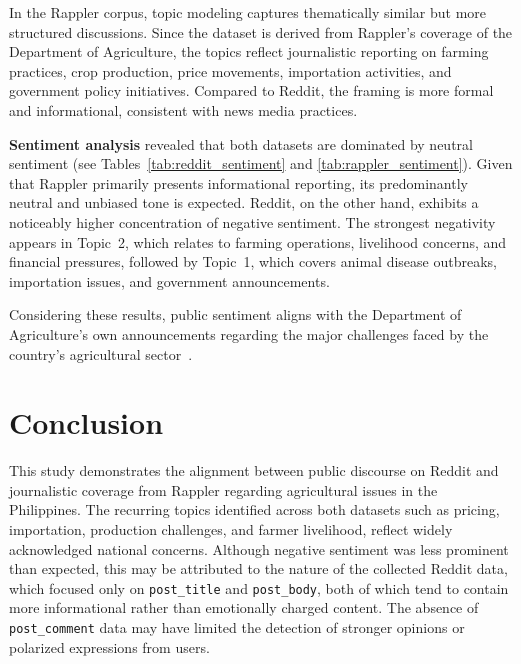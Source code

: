 \documentclass[conference]{IEEEtran}
\begin{document}
In the Rappler corpus, topic modeling captures thematically similar but more structured 
discussions. Since the dataset is derived from Rappler’s coverage of the Department of 
Agriculture, the topics reflect journalistic reporting on farming practices, crop production, 
price movements, importation activities, and government policy initiatives. Compared to 
Reddit, the framing is more formal and informational, consistent with news media practices.

\textbf{Sentiment analysis} revealed that both datasets are dominated by neutral sentiment 
(see Tables~\ref{tab:reddit_sentiment} and \ref{tab:rappler_sentiment}). Given that Rappler 
primarily presents informational reporting, its predominantly neutral and unbiased tone is 
expected. Reddit, on the other hand, exhibits a noticeably higher concentration of negative 
sentiment. The strongest negativity appears in Topic~2, which relates to farming operations, 
livelihood concerns, and financial pressures, followed by Topic~1, which covers animal disease 
outbreaks, importation issues, and government announcements.

Considering these results, public sentiment aligns with the Department of Agriculture’s 
own announcements regarding the major challenges faced by the country’s agricultural 
sector~\cite{a1}.



\section{Conclusion}

This study demonstrates the alignment between public discourse on Reddit and journalistic 
coverage from Rappler regarding agricultural issues in the Philippines. The recurring topics 
identified across both datasets such as pricing, importation, production challenges, and 
farmer livelihood, reflect widely acknowledged national concerns. Although negative sentiment 
was less prominent than expected, this may be attributed to the nature of the collected 
Reddit data, which focused only on \texttt{post\_title} and \texttt{post\_body}, both of 
which tend to contain more informational rather than emotionally charged content. The 
absence of \texttt{post\_comment} data may have limited the detection of stronger opinions 
or polarized expressions from users.
\end{document}
